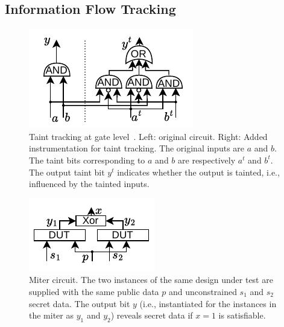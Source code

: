 \subsection{Information Flow Tracking}
\label{subsec:ift}

\begin{figure}[t]
    \begin{center}
    \includegraphics[width=0.5\columnwidth]{figures/glift/glift.pdf}
    \end{center}
    \vspace*{-1em}
    \caption{\label{fig:glift} Taint tracking at gate level~\cite{tiwari2009complete}. Left: original circuit. Right: Added instrumentation for taint tracking. The original inputs are $a$ and $b$. The taint bits corresponding to $a$ and $b$ are respectively $a^t$ and $b^t$. The output taint bit $y^t$ indicates whether the output is tainted, i.e., influenced by the tainted inputs.}
    \vspace*{-1em}
\end{figure}

\begin{figure}[t]
    \begin{center}
    \includegraphics[width=0.5\columnwidth]{figures/miter/miter.pdf}
    \end{center}
    \vspace*{-2em}
    \caption{\label{fig:miter} Miter circuit. The two instances of the same design under test are supplied with the same public data $p$ and unconstrained $s_1$ and $s_2$ secret data. The output bit $y$ (i.e., instantiated for the instances in the miter as $y_1$ and $y_2$) reveals secret data if $x=1$ is satisfiable.}
\end{figure}

